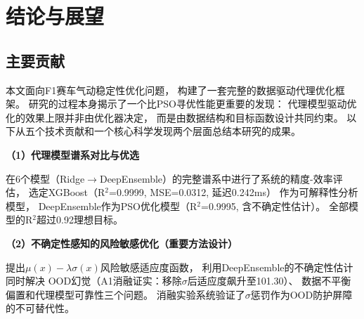 \section{结论与展望}

\subsection{主要贡献}

本文面向F1赛车气动稳定性优化问题，
构建了一套完整的数据驱动代理优化框架。
研究的过程本身揭示了一个比PSO寻优性能更重要的发现：
代理模型驱动优化的效果上限并非由优化器决定，
而是由数据结构和目标函数设计共同约束。
以下从五个技术贡献和一个核心科学发现两个层面总结本研究的成果。

\vspace{0.2cm}

\begin{center}
\end{center}

\vspace{0.3cm}

\noindent
\textbf{（1）代理模型谱系对比与优选}

在6个模型（Ridge$\to$DeepEnsemble）的完整谱系中进行了系统的精度-效率评估，
选定XGBoost（R$^2$=0.9999, MSE=0.0312, 延迟0.242ms）
作为可解释性分析模型，
DeepEnsemble作为PSO优化模型（R$^2$=0.9995, 含不确定性估计）。
全部模型的R$^2$超过0.92理想目标。

\vspace{0.3cm}

\noindent
\textbf{（2）不确定性感知的风险敏感优化（重要方法设计）}

提出$\mu(x) - \lambda\sigma(x)$风险敏感适应度函数，
利用DeepEnsemble的不确定性估计同时解决
OOD幻觉（A1消融证实：移除$\sigma$后适应度飙升至101.30）、
数据不平衡偏置和代理模型可靠性三个问题。
消融实验系统验证了$\sigma$惩罚作为OOD防护屏障的不可替代性。

